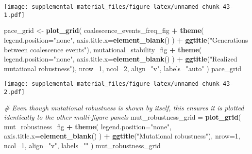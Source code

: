 \documentclass[]{book}
\newenvironment{Shaded}{\begin{snugshade}}{\end{snugshade}}
\newcommand{\CommentTok}[1]{\textcolor[rgb]{0.56,0.35,0.01}{\textit{#1}}}
\newcommand{\DataTypeTok}[1]{\textcolor[rgb]{0.13,0.29,0.53}{#1}}
\newcommand{\DecValTok}[1]{\textcolor[rgb]{0.00,0.00,0.81}{#1}}
\newcommand{\KeywordTok}[1]{\textcolor[rgb]{0.13,0.29,0.53}{\textbf{#1}}}
\newcommand{\NormalTok}[1]{#1}
\newcommand{\OperatorTok}[1]{\textcolor[rgb]{0.81,0.36,0.00}{\textbf{#1}}}
\newcommand{\StringTok}[1]{\textcolor[rgb]{0.31,0.60,0.02}{#1}}
\begin{document}
\texttt{[image: supplemental-material\_files/figure-latex/unnamed-chunk-43-1.pdf]}

\begin{Shaded}
\begin{Highlighting}[]
\NormalTok{pace_grid <-}\StringTok{ }\KeywordTok{plot_grid}\NormalTok{(}
\NormalTok{  coalescence_events_freq_fig }\OperatorTok{+}
\StringTok{    }\KeywordTok{theme}\NormalTok{(}
      \DataTypeTok{legend.position=}\StringTok{"none"}\NormalTok{,}
      \DataTypeTok{axis.title.x=}\KeywordTok{element_blank}\NormalTok{()}
\NormalTok{    ) }\OperatorTok{+}
\StringTok{    }\KeywordTok{ggtitle}\NormalTok{(}\StringTok{"Generations between coalescence events"}\NormalTok{),}
\NormalTok{  mutational_stability_fig }\OperatorTok{+}
\StringTok{    }\KeywordTok{theme}\NormalTok{(}
      \DataTypeTok{legend.position=}\StringTok{"none"}\NormalTok{,}
      \DataTypeTok{axis.title.x=}\KeywordTok{element_blank}\NormalTok{()}
\NormalTok{    ) }\OperatorTok{+}
\StringTok{    }\KeywordTok{ggtitle}\NormalTok{(}\StringTok{"Realized mutational robustness"}\NormalTok{),}
  \DataTypeTok{nrow=}\DecValTok{1}\NormalTok{,}
  \DataTypeTok{ncol=}\DecValTok{2}\NormalTok{,}
  \DataTypeTok{align=}\StringTok{"v"}\NormalTok{,}
  \DataTypeTok{labels=}\StringTok{"auto"}
\NormalTok{)}
\NormalTok{pace_grid}
\end{Highlighting}
\end{Shaded}

\texttt{[image: supplemental-material\_files/figure-latex/unnamed-chunk-43-2.pdf]}

\begin{Shaded}
\begin{Highlighting}[]
\CommentTok{# Even though mutational robustness is shown by itself, this ensures it is plotted identically to the other multi-figure panels}
\NormalTok{mut_robustness_grid =}\StringTok{ }\KeywordTok{plot_grid}\NormalTok{(}
\NormalTok{  mut_robustness_fig }\OperatorTok{+}
\StringTok{    }\KeywordTok{theme}\NormalTok{(}
      \DataTypeTok{legend.position=}\StringTok{"none"}\NormalTok{,}
      \DataTypeTok{axis.title.x=}\KeywordTok{element_blank}\NormalTok{()}
\NormalTok{    ) }\OperatorTok{+}
\StringTok{    }\KeywordTok{ggtitle}\NormalTok{(}\StringTok{"Mutational robustness"}\NormalTok{),}
  \DataTypeTok{nrow=}\DecValTok{1}\NormalTok{,}
  \DataTypeTok{ncol=}\DecValTok{1}\NormalTok{,}
  \DataTypeTok{align=}\StringTok{"v"}\NormalTok{,}
  \DataTypeTok{labels=}\StringTok{""}
\NormalTok{) }
\NormalTok{mut_robustness_grid}
\end{Highlighting}
\end{Shaded}
\end{document}
